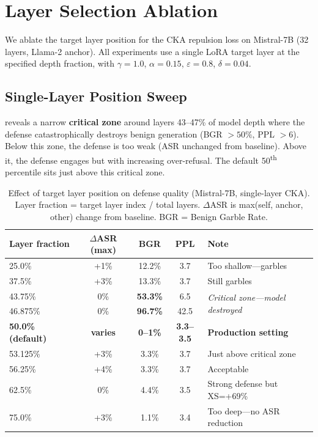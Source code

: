 \section{Layer Selection Ablation}
\label{app:layer_ablation}

We ablate the target layer position for the CKA repulsion loss on Mistral-7B (32 layers, Llama-2 anchor). All experiments use a single LoRA target layer at the specified depth fraction, with $\gamma{=}1.0$, $\alpha{=}0.15$, $\varepsilon{=}0.8$, $\delta{=}0.04$.

\subsection{Single-Layer Position Sweep}

 reveals a narrow \textbf{critical zone} around layers 43--47\% of model depth where the defense catastrophically destroys benign generation (BGR $>50\%$, PPL $>6$). Below this zone, the defense is too weak (ASR unchanged from baseline). Above it, the defense engages but with increasing over-refusal. The default 50\textsuperscript{th} percentile sits just above this critical zone.

\begin{table}[h]
\centering
\setlength{\tabcolsep}{5pt}
\renewcommand{\arraystretch}{1.1}
\caption{Effect of target layer position on defense quality (Mistral-7B, single-layer CKA). Layer fraction = target layer index / total layers. $\Delta$ASR is max(self, anchor, other) change from baseline. BGR = Benign Garble Rate.}
\label{tab:layer_position}
\begin{tabular}{@{}lcccl@{}}
\toprule
\textbf{Layer fraction} & \textbf{$\Delta$ASR (max)} & \textbf{BGR} & \textbf{PPL} & \textbf{Note} \\
\midrule
25.0\% & +1\% & 12.2\% & 3.7 & Too shallow---garbles \\
37.5\% & +3\% & 13.3\% & 3.7 & Still garbles \\
43.75\% & 0\% & \textbf{53.3\%} & 6.5 & \multirow{2}{*}{\textit{Critical zone---model destroyed}} \\
46.875\% & 0\% & \textbf{96.7\%} & 42.5 & \\
\midrule
\textbf{50.0\% (default)} & \textbf{varies} & \textbf{0--1\%} & \textbf{3.3--3.5} & \textbf{Production setting} \\
\midrule
53.125\% & +3\% & 3.3\% & 3.7 & Just above critical zone \\
56.25\% & +4\% & 3.3\% & 3.7 & Acceptable \\
62.5\% & 0\% & 4.4\% & 3.5 & Strong defense but XS=+69\% \\
75.0\% & +3\% & 1.1\% & 3.4 & Too deep---no ASR reduction \\
\bottomrule
\end{tabular}
\renewcommand{\arraystretch}{1.0}
\end{table}

